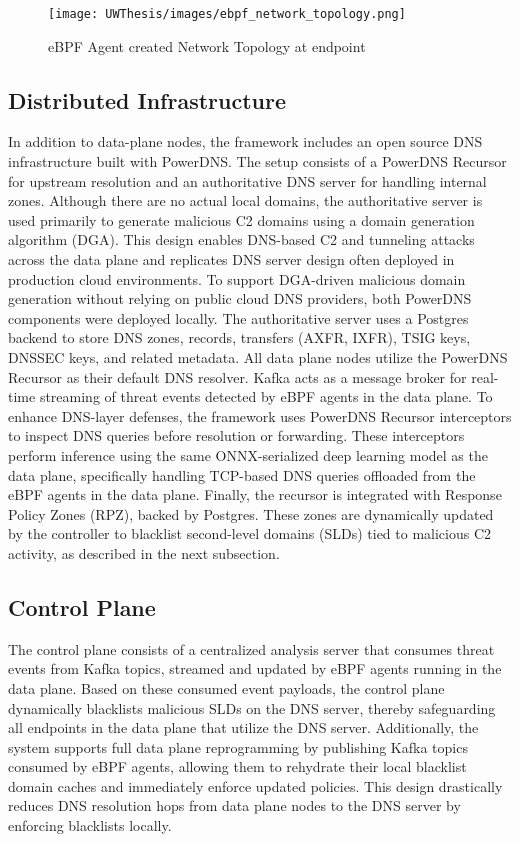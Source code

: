 \documentclass [11pt, proquest] {uwthesis}[2020/02/24]
\begin{document}
\begin{figure}[htbp]
\centering
\texttt{[image: UWThesis/images/ebpf\_network\_topology.png]}
\caption{eBPF Agent created Network Topology at endpoint}
\label{sec:dp_eBPF_agent_net_topology}
\end{figure}

\subsection{Distributed Infrastructure}
In addition to data-plane nodes, the framework includes an open source DNS infrastructure built with PowerDNS. The setup consists of a PowerDNS Recursor for upstream resolution and an authoritative DNS server for handling internal zones. Although there are no actual local domains, the authoritative server is used primarily to generate malicious C2 domains using a domain generation algorithm (DGA). This design enables DNS-based C2 and tunneling attacks across the data plane and replicates DNS server design often deployed in production cloud environments. To support DGA-driven malicious domain generation without relying on public cloud DNS providers, both PowerDNS components were deployed locally. The authoritative server uses a Postgres backend to store DNS zones, records, transfers (AXFR, IXFR), TSIG keys, DNSSEC keys, and related metadata. All data plane nodes utilize the PowerDNS Recursor as their default DNS resolver. Kafka acts as a message broker for real-time streaming of threat events detected by eBPF agents in the data plane. To enhance DNS-layer defenses, the framework uses PowerDNS Recursor interceptors to inspect DNS queries before resolution or forwarding. These interceptors perform inference using the same ONNX-serialized deep learning model as the data plane, specifically handling TCP-based DNS queries offloaded from the eBPF agents in the data plane. Finally, the recursor is integrated with Response Policy Zones (RPZ), backed by Postgres. These zones are dynamically updated by the controller to blacklist second-level domains (SLDs) tied to malicious C2 activity, as described in the next subsection.

\subsection{Control Plane}
The control plane consists of a centralized analysis server that consumes threat events from Kafka topics, streamed and updated by eBPF agents running in the data plane. Based on these consumed event payloads, the control plane dynamically blacklists malicious SLDs on the DNS server, thereby safeguarding all endpoints in the data plane that utilize the DNS server. Additionally, the system supports full data plane reprogramming by publishing Kafka topics consumed by eBPF agents, allowing them to rehydrate their local blacklist domain caches and immediately enforce updated policies. This design drastically reduces DNS resolution hops from data plane nodes to the DNS server by enforcing blacklists locally.
\end{document}
